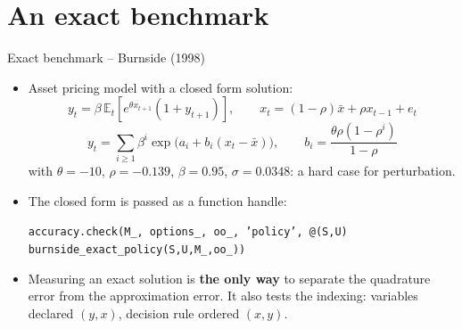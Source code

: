 \documentclass[11pt,aspectratio=169]{beamer}
\newcommand{\E}{\mathbb{E}}
\newcommand{\code}[1]{\texttt{#1}}
\begin{document}
\section{An exact benchmark}

\begin{frame}{Exact benchmark -- Burnside (1998)}

\begin{itemize}

\item Asset pricing model with a closed form solution:
  \[
  y_t = \beta\,\E_t\left[e^{\theta x_{t+1}}(1+y_{t+1})\right],\qquad x_t = (1-\rho)\bar x + \rho x_{t-1} + e_t
  \]
  \[
  y_t = \sum_{i\geq1}\beta^i\exp\big(a_i + b_i(x_t-\bar x)\big),\qquad b_i = \frac{\theta\rho(1-\rho^i)}{1-\rho}
  \]
  with $\theta=-10$, $\rho=-0.139$, $\beta=0.95$, $\sigma=0.0348$: a hard case for perturbation.\newline

\item The closed form is passed as a function handle:
  \begin{center}
  \code{accuracy.check(M\_, options\_, oo\_, 'policy', @(S,U) burnside\_exact\_policy(S,U,M\_,oo\_))}
  \end{center}

\item Measuring an exact solution is \textbf{the only way} to separate the quadrature error from the approximation error. It also tests the indexing: variables declared $(y,x)$, decision rule ordered $(x,y)$.

\end{itemize}

\end{frame}
\end{document}
